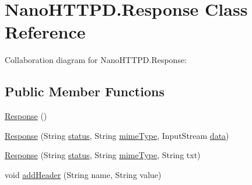 \hypertarget{classcom_1_1axcoto_1_1shinjuku_1_1maki_1_1_nano_h_t_t_p_d_1_1_response}{\section{\-Nano\-H\-T\-T\-P\-D.\-Response \-Class \-Reference}
\label{classcom_1_1axcoto_1_1shinjuku_1_1maki_1_1_nano_h_t_t_p_d_1_1_response}
}


\-Collaboration diagram for \-Nano\-H\-T\-T\-P\-D.\-Response\-:
\subsection*{\-Public \-Member \-Functions}
\begin{DoxyCompactItemize}
\item 
\hyperlink{classcom_1_1axcoto_1_1shinjuku_1_1maki_1_1_nano_h_t_t_p_d_1_1_response_aa622db3f1d240d8044a939ba95d1a760}{\-Response} ()
\item 
\hyperlink{classcom_1_1axcoto_1_1shinjuku_1_1maki_1_1_nano_h_t_t_p_d_1_1_response_a7646c8b256df3d46b93e76782fb57649}{\-Response} (\-String \hyperlink{classcom_1_1axcoto_1_1shinjuku_1_1maki_1_1_nano_h_t_t_p_d_1_1_response_a4e531c185af848083db0808335a78168}{status}, \-String \hyperlink{classcom_1_1axcoto_1_1shinjuku_1_1maki_1_1_nano_h_t_t_p_d_1_1_response_a09c78e464072ccab667894f0d179fbdf}{mime\-Type}, \-Input\-Stream \hyperlink{classcom_1_1axcoto_1_1shinjuku_1_1maki_1_1_nano_h_t_t_p_d_1_1_response_a249c1175304a02be30d8409a6b378d24}{data})
\item 
\hyperlink{classcom_1_1axcoto_1_1shinjuku_1_1maki_1_1_nano_h_t_t_p_d_1_1_response_a500a8dc6f30cff33436ec1b366e9a15e}{\-Response} (\-String \hyperlink{classcom_1_1axcoto_1_1shinjuku_1_1maki_1_1_nano_h_t_t_p_d_1_1_response_a4e531c185af848083db0808335a78168}{status}, \-String \hyperlink{classcom_1_1axcoto_1_1shinjuku_1_1maki_1_1_nano_h_t_t_p_d_1_1_response_a09c78e464072ccab667894f0d179fbdf}{mime\-Type}, \-String txt)
\item 
void \hyperlink{classcom_1_1axcoto_1_1shinjuku_1_1maki_1_1_nano_h_t_t_p_d_1_1_response_a64eafade5fabc6691cb1f28637943cea}{add\-Header} (\-String name, \-String value)
\end{DoxyCompactItemize}

